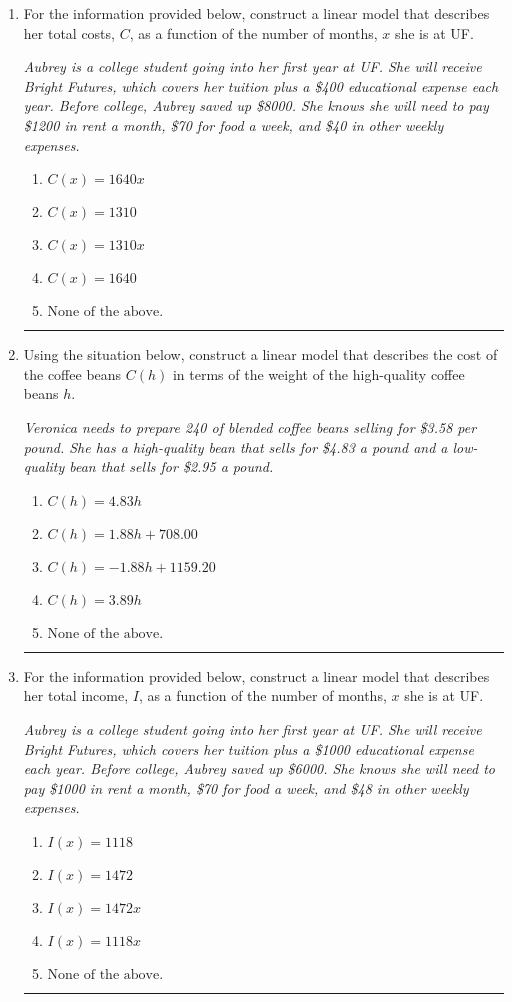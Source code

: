 \documentclass[14pt]{extbook}
\newcommand{\litem}[1]{\item#1\hspace*{-1cm}\rule{\textwidth}{0.4pt}}
\begin{document}
\begin{enumerate}
{\begin{enumerate}[label=\Alph*.]
\end{enumerate} }
\litem{
For the information provided below, construct a linear model that describes her total costs, $C$, as a function of the number of months, $x$ she is at UF. 
\begin{center}
    \textit{ Aubrey is a college student going into her first year at UF. She will receive Bright Futures, which covers her tuition plus a \$400 educational expense each year. Before college, Aubrey saved up \$8000. She knows she will need to pay \$1200 in rent a month, \$70 for food a week, and \$40 in other weekly expenses. }
\end{center}
\begin{enumerate}[label=\Alph*.]
\item \( C(x) = 1640 x \)
\item \( C(x) = 1310 \)
\item \( C(x) = 1310 x \)
\item \( C(x) = 1640 \)
\item \( \text{None of the above.} \)

\end{enumerate} }
\litem{
Using the situation below, construct a linear model that describes the cost of the coffee beans $C(h)$ in terms of the weight of the high-quality coffee beans $h$.
\begin{center}
    \textit{ Veronica needs to prepare 240 of blended coffee beans selling for \$3.58 per pound. She has a high-quality bean that sells for \$4.83 a pound and a low-quality bean that sells for \$2.95 a pound. }
\end{center}
\begin{enumerate}[label=\Alph*.]
\item \( C(h) = 4.83 h \)
\item \( C(h) = 1.88 h + 708.00 \)
\item \( C(h) = -1.88 h + 1159.20 \)
\item \( C(h) = 3.89 h \)
\item \( \text{None of the above.} \)

\end{enumerate} }
\litem{
For the information provided below, construct a linear model that describes her total income, $I$, as a function of the number of months, $x$ she is at UF.
\begin{center}
    \textit{ Aubrey is a college student going into her first year at UF. She will receive Bright Futures, which covers her tuition plus a \$1000 educational expense each year. Before college, Aubrey saved up \$6000. She knows she will need to pay \$1000 in rent a month, \$70 for food a week, and \$48 in other weekly expenses. }
\end{center}
\begin{enumerate}[label=\Alph*.]
\item \( I(x) = 1118 \)
\item \( I(x) = 1472 \)
\item \( I(x) = 1472 x \)
\item \( I(x) = 1118 x \)
\item \( \text{None of the above.} \)


\end{enumerate}}
\end{enumerate}
\end{document}
